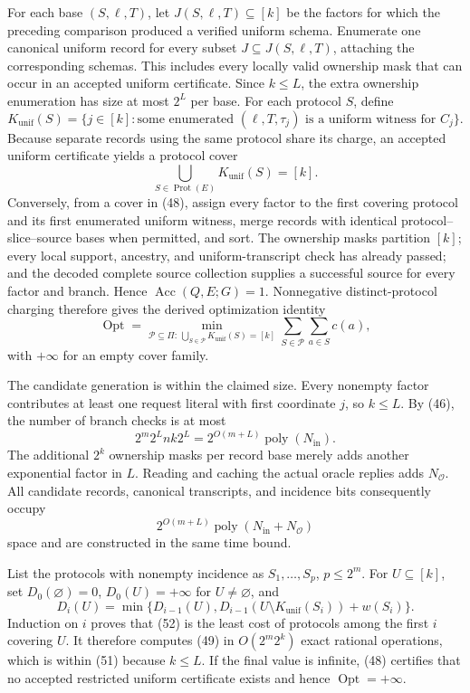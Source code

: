 For each base \((S,\ell,T)\), let \(J(S,\ell,T)\subseteq[k]\) be the factors for which the preceding comparison produced a verified uniform schema.  Enumerate one canonical uniform record for every subset \(J\subseteq J(S,\ell,T)\), attaching the corresponding schemas.  This includes every locally valid ownership mask that can occur in an accepted uniform certificate.  Since \(k\leq L\), the extra ownership enumeration has size at most \(2^L\) per base.  For each protocol \(S\), define
\[
 K_{\mathrm{unif}}(S)
 =\{j\in[k]:\text{some enumerated }(\ell,T,\tau_j)
 \text{ is a uniform witness for }C_j\}.
 \tag{47}
\]
Because separate records using the same protocol share its charge, an accepted uniform certificate yields a protocol cover
\[
 \bigcup_{S\in\operatorname{Prot}(E)}K_{\mathrm{unif}}(S)=[k].
 \tag{48}
\]
Conversely, from a cover in (48), assign every factor to the first covering protocol and its first enumerated uniform witness, merge records with identical protocol--slice--source bases when permitted, and sort.  The ownership masks partition \([k]\); every local support, ancestry, and uniform-transcript check has already passed; and the decoded complete source collection supplies a successful source for every factor and branch.  Hence \(\operatorname{Acc}(Q,E;G)=1\).  Nonnegative distinct-protocol charging therefore gives the derived optimization identity
\[
 \operatorname{Opt}
 =\min_{\mathcal P\subseteq\Pi:\,\bigcup_{S\in\mathcal P}K_{\mathrm{unif}}(S)=[k]}
   \sum_{S\in\mathcal P}\sum_{a\in S}c(a),
 \tag{49}
\]
with \(+\infty\) for an empty cover family.

The candidate generation is within the claimed size.  Every nonempty factor contributes at least one request literal with first coordinate \(j\), so \(k\leq L\).  By (46), the number of branch checks is at most
\[
 2^m2^Lnk2^L
 =2^{O(m+L)}\operatorname{poly}(N_{\mathrm{in}}).
 \tag{50}
\]
The additional \(2^k\) ownership masks per record base merely adds another exponential factor in \(L\).  Reading and caching the actual oracle replies adds \(N_{\mathcal O}\).  All candidate records, canonical transcripts, and incidence bits consequently occupy
\[
 2^{O(m+L)}\operatorname{poly}(N_{\mathrm{in}}+N_{\mathcal O})
 \tag{51}
\]
space and are constructed in the same time bound.

List the protocols with nonempty incidence as \(S_1,\ldots,S_p\), \(p\leq2^m\).  For \(U\subseteq[k]\), set \(D_0(\varnothing)=0\), \(D_0(U)=+\infty\) for \(U\ne\varnothing\), and
\[
 D_i(U)=\min\{D_{i-1}(U),
 D_{i-1}(U\setminus K_{\mathrm{unif}}(S_i))+w(S_i)\}.
 \tag{52}
\]
Induction on \(i\) proves that (52) is the least cost of protocols among the first \(i\) covering \(U\).  It therefore computes (49) in \(O(2^m2^k)\) exact rational operations, which is within (51) because \(k\leq L\).  If the final value is infinite, (48) certifies that no accepted restricted uniform certificate exists and hence \(\operatorname{Opt}=+\infty\).

